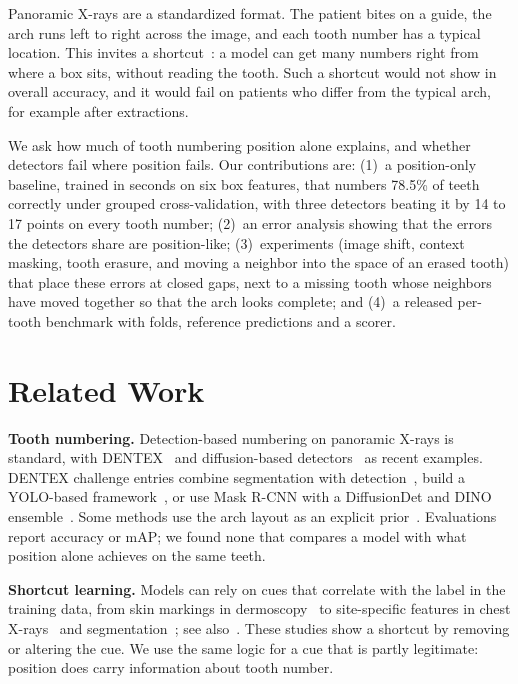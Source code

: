 \documentclass[runningheads]{llncs}
\begin{document}
Panoramic X-rays are a standardized format. The patient bites on a guide,
the arch runs left to right across the image, and each tooth number has a
typical location. This invites a shortcut~\cite{geirhos2020shortcut}: a
model can get many numbers right from where a box sits, without reading the
tooth. Such a shortcut would not show in overall accuracy, and it would fail
on patients who differ from the typical arch, for example after extractions.

We ask how much of tooth numbering position alone explains, and whether
detectors fail where position fails. Our contributions are:
(1)~a position-only baseline, trained in seconds on six box features, that
numbers 78.5\% of teeth correctly under grouped cross-validation, with three
detectors beating it by 14 to 17 points on every tooth number;
(2)~an error analysis showing that the errors the detectors share are
position-like;
(3)~experiments (image shift, context masking, tooth erasure, and moving a
neighbor into the space of an erased tooth) that place these errors at
closed gaps, next to a missing tooth whose neighbors have moved together so
that the arch looks complete; and
(4)~a released per-tooth benchmark with folds, reference predictions and a
scorer.

\section{Related Work}

\textbf{Tooth numbering.} Detection-based numbering on panoramic X-rays is
standard, with DENTEX~\cite{hamamci2023dentex} and diffusion-based
detectors~\cite{hamamci2023hierarchical} as recent examples. DENTEX challenge entries combine segmentation with detection~\cite{he2023dentex}, build a YOLO-based framework~\cite{mei2023yolortho}, or use Mask R-CNN with a DiffusionDet and DINO ensemble~\cite{choi2023detdet}. Some methods
use the arch layout as an explicit prior~\cite{budagam2024oralbbnet}.
Evaluations report accuracy or mAP; we found none that compares a model with
what position alone achieves on the same teeth.

\textbf{Shortcut learning.} Models can rely on cues that correlate with the
label in the training data, from skin markings in
dermoscopy~\cite{winkler2019markings} to site-specific features in chest
X-rays~\cite{degrave2021covid} and segmentation~\cite{lin2024shortcut}; see
also~\cite{hill2024shortcutting,cajas2026shortkit}. These studies show a
shortcut by removing or altering the cue. We use the same logic for a cue
that is partly legitimate: position does carry information about tooth
number.
\end{document}
